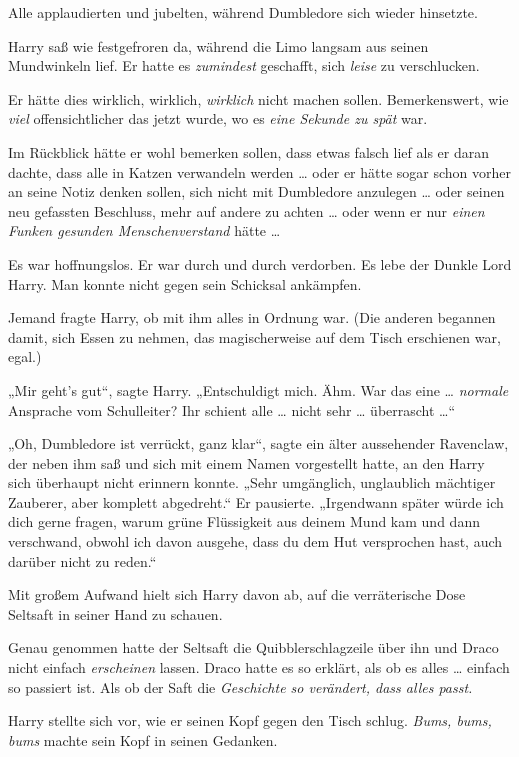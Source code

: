 Alle applaudierten und jubelten, während Dumbledore sich wieder hinsetzte.

Harry saß wie festgefroren da, während die Limo langsam aus seinen Mundwinkeln lief. Er hatte es \emph{zumindest} geschafft, sich \emph{leise} zu verschlucken.

Er hätte dies wirklich, wirklich, \emph{wirklich} nicht machen sollen. Bemerkenswert, wie \emph{viel} offensichtlicher das jetzt wurde, wo es \emph{eine Sekunde zu spät} war.

Im Rückblick hätte er wohl bemerken sollen, dass etwas falsch lief als er daran dachte, dass alle in Katzen verwandeln werden … oder er hätte sogar schon vorher an seine Notiz denken sollen, sich nicht mit Dumbledore anzulegen … oder seinen neu gefassten Beschluss, mehr auf andere zu achten … oder wenn er nur \emph{einen Funken gesunden Menschenverstand} hätte …

Es war hoffnungslos. Er war durch und durch verdorben. Es lebe der Dunkle Lord Harry. Man konnte nicht gegen sein Schicksal ankämpfen.

Jemand fragte Harry, ob mit ihm alles in Ordnung war. (Die anderen begannen damit, sich Essen zu nehmen, das magischerweise auf dem Tisch erschienen war, egal.)

„Mir geht's gut“, sagte Harry. „Entschuldigt mich. Ähm. War das eine … \emph{normale} Ansprache vom Schulleiter? Ihr schient alle … nicht sehr … überrascht …“

„Oh, Dumbledore ist verrückt, ganz klar“, sagte ein älter aussehender Ravenclaw, der neben ihm saß und sich mit einem Namen vorgestellt hatte, an den Harry sich überhaupt nicht erinnern konnte. „Sehr umgänglich, unglaublich mächtiger Zauberer, aber komplett abgedreht.“ Er pausierte. „Irgendwann später würde ich dich gerne fragen, warum grüne Flüssigkeit aus deinem Mund kam und dann verschwand, obwohl ich davon ausgehe, dass du dem Hut versprochen hast, auch darüber nicht zu reden.“

Mit großem Aufwand hielt sich Harry davon ab, auf die verräterische Dose Seltsaft in seiner Hand zu schauen.

Genau genommen hatte der Seltsaft die Quibblerschlagzeile über ihn und Draco nicht einfach \emph{erscheinen} lassen. Draco hatte es so erklärt, als ob es alles … einfach so passiert ist. Als ob der Saft die \emph{Geschichte so verändert, dass alles passt.}

Harry stellte sich vor, wie er seinen Kopf gegen den Tisch schlug. \emph{Bums, bums, bums} machte sein Kopf in seinen Gedanken.

